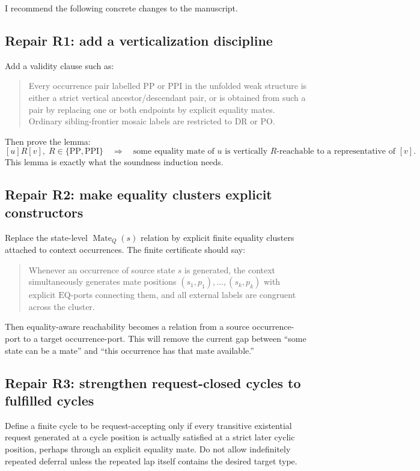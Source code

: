 \documentclass[11pt]{article}
\newcommand{\EQ}{\mathrm{EQ}}
\newcommand{\DR}{\mathrm{DR}}
\newcommand{\PO}{\mathrm{PO}}
\newcommand{\PP}{\mathrm{PP}}
\newcommand{\PPI}{\mathrm{PPI}}
\newcommand{\Mate}{\operatorname{Mate}}
\begin{document}
I recommend the following concrete changes to the manuscript.

\subsection{Repair R1: add a verticalization discipline}

Add a validity clause such as:
\begin{quote}
Every occurrence pair labelled \(\PP\) or \(\PPI\) in the unfolded weak structure is either a strict vertical ancestor/descendant pair, or is obtained from such a pair by replacing one or both endpoints by explicit equality mates.  Ordinary sibling-frontier mosaic labels are restricted to \(\DR\) or \(\PO\).
\end{quote}
Then prove the lemma:
\[
 [u]R[v],\; R\in\{\PP,\PPI\}
 \quad\Longrightarrow\quad
 \text{some equality mate of }u\text{ is vertically }R\text{-reachable to a representative of }[v].
\]
This lemma is exactly what the soundness induction needs.

\subsection{Repair R2: make equality clusters explicit constructors}

Replace the state-level \(\Mate_Q(s)\) relation by explicit finite equality clusters attached to context occurrences.  The finite certificate should say:
\begin{quote}
Whenever an occurrence of source state \(s\) is generated, the context simultaneously generates mate positions \((s_1,p_1),\ldots,(s_k,p_k)\) with explicit \(\EQ\)-ports connecting them, and all external labels are congruent across the cluster.
\end{quote}
Then equality-aware reachability becomes a relation from a source occurrence-port to a target occurrence-port.  This will remove the current gap between ``some state can be a mate'' and ``this occurrence has that mate available.''

\subsection{Repair R3: strengthen request-closed cycles to fulfilled cycles}

Define a finite cycle to be request-accepting only if every transitive existential request generated at a cycle position is actually satisfied at a strict later cyclic position, perhaps through an explicit equality mate.  Do not allow indefinitely repeated deferral unless the repeated lap itself contains the desired target type.
\end{document}
